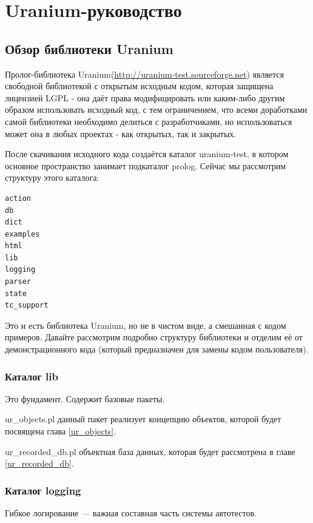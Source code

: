 \documentclass[a4paper]{book}
\def\ur{Uranium}
\begin{document}
\part{\ur-руководство}
\chapter{Обзор библиотеки \ur}

Пролог-библиотека \ur (\url{http://uranium-test.sourceforge.net})
является свободной библиотекой с открытым исходным кодом, которая
защищена лицензией LGPL - она даёт права модифицировать или
каким-либо другим образом использовать исходный код, с тем
ограничением, что всеми доработками самой библиотеки необходимо
делиться с разработчиками, но использоваться может она в любых
проектах - как открытых, так и закрытых.

После скачивания исходного кода создаётся каталог uranium-test, в
котором основное пространство занимает подкаталог prolog. Сейчас
мы рассмотрим структуру этого каталога:

\begin{verbatim}
action
db
dict
examples
html
lib
logging
parser
state
tc_support
\end{verbatim}

Это и есть библиотека \ur, но не в чистом виде, а смешанная с
кодом примеров. Давайте рассмотрим подробно структуру библиотеки
и отделим её от демонстрационного кода (который предназначен для
замены кодом пользователя).

\section{Каталог lib}

Это фундамент. Содержит базовые пакеты.

\begin{description} 
\item ur_objects.pl данный пакет реализует концепцию
  объектов, которой будет посвящена глава \ref{ur_objects}.
\item ur_recorded_db.pl объектная база данных, которая
  будет рассмотрена в главе \ref{ur_recorded_db}.
\end{description}

\section{Каталог logging}

Гибкое логирование --- важная составная часть системы автотестов.
\end{document}
